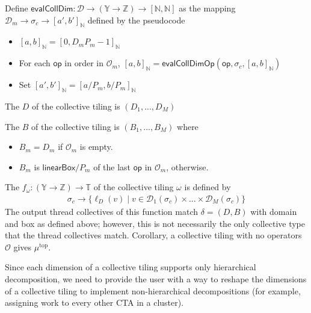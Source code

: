 \filbreak
Define $\mathsf{evalCollDim}: \mathcal{D} \to (\mathbb{Y} \to \mathbb{Z}) \to [\mathbb{N}, \mathbb{N}]$
as the mapping $\mathcal{D}_m \to \sigma_c \to [a', b']_\mathbb{N}$ defined by the pseudocode
\begin{itemize}
  \item $[a, b]_\mathbb{N} = [0, D_mP_m-1]_\mathbb{N}$
  \item For each $\mathsf{op}$ in order in $\mathcal{O}_m$, $[a, b]_\mathbb{N} = \mathsf{evalCollDimOp}(\mathsf{op}, \sigma_c, [a, b]_\mathbb{N})$
  \item Set $[a', b']_\mathbb{N} = [a / P_m, b / P_m]_\mathbb{N}$
\end{itemize}

\filbreak
The  $D$ of the collective tiling is $(D_1, ..., D_M)$

\filbreak
The  $B$ of the collective tiling is $(B_1, ..., B_M)$ where
\begin{itemize}
  \item $B_m = D_m$ if $\mathcal{O}_m$ is empty.
  \item $B_m$ is $\mathsf{linearBox} / P_m$ of the last $\mathsf{op}$ in $\mathcal{O}_m$, otherwise.
\end{itemize}

\filbreak
The  $f_\omega: (\mathbb{Y} \to \mathbb{Z}) \to \mathbb{T}$ of the collective tiling $\omega$ is defined by
\begin{gather*}
  \sigma_c \to \{ \ell_D(v) \mid v \in \mathcal{D}_1(\sigma_c) \times ... \times \mathcal{D}_M(\sigma_c) \}
\end{gather*}
\filbreak
The output thread collectives of this function match $\delta = (D, B)$ with domain and box as defined above; however, this is not necessarily the only collective type that the thread collectives match.
Corollary, a collective tiling with no operators $\mathcal{O}$ gives $\mu^\text{top}$.

\filbreak
{}


Since each dimension of a collective tiling supports only hierarchical decomposition, we need to provide the user with a way to reshape the dimensions of a collective tiling to implement non-hierarchical decompositions
(for example, assigning work to every other CTA in a cluster).

